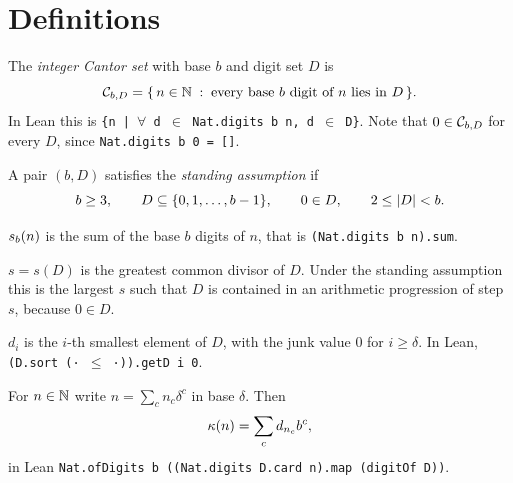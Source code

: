 \section{Definitions}

\begin{definition}
  \label{def:cantorSet}
  \leanok
  The \emph{integer Cantor set} with base $b$ and digit set $D$ is
  \[
    \mathcal{C}_{b,D} = \{\, n \in \mathbb{N} \;:\; \text{every base } b \text{ digit of } n
      \text{ lies in } D \,\}.
  \]
  In Lean this is \texttt{\{n | $\forall$ d $\in$ Nat.digits b n, d $\in$ D\}}.
  Note that $0 \in \mathcal{C}_{b,D}$ for every $D$, since \texttt{Nat.digits b 0 = []}.
\end{definition}

\begin{definition}
  \label{def:standing}
  \leanok
  A pair $(b, D)$ satisfies the \emph{standing assumption} if
  \[
    b \geq 3, \qquad D \subseteq \{0, 1, \ldots, b-1\}, \qquad 0 \in D,
    \qquad 2 \leq \left\lvert D \right\rvert < b .
  \]
\end{definition}

\begin{definition}
  \label{def:sumDigits}
  \leanok
  $s_b(n)$ is the sum of the base $b$ digits of $n$, that is
  \texttt{(Nat.digits b n).sum}.
\end{definition}

\begin{definition}
  \label{def:stepSize}
  \leanok
  $s = s(D)$ is the greatest common divisor of $D$. Under the standing
  assumption this is the largest $s$ such that $D$ is contained in an
  arithmetic progression of step $s$, because $0 \in D$.
\end{definition}

\begin{definition}
  \label{def:digitOf}
  \leanok
  $d_i$ is the $i$-th smallest element of $D$, with the junk value $0$ for
  $i \geq \delta$. In Lean, \texttt{(D.sort (· $\leq$ ·)).getD i 0}.
\end{definition}

\begin{definition}
  \label{def:enum}
  \leanok
  For $n \in \mathbb{N}$ write $n = \sum_c n_c \delta^c$ in base $\delta$. Then
  \[
    \kappa(n) = \sum_c d_{n_c} b^c ,
  \]
  in Lean \texttt{Nat.ofDigits b ((Nat.digits D.card n).map (digitOf D))}.
\end{definition}

